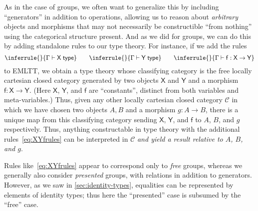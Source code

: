 \documentclass[12pt]{article}
\def\ty{\;\mathsf{type}}
\def\m#1{\llbracket#1\rrbracket}
\def\types{\vdash}
\def\U{\mathscr{U}}
\def\C{\mathscr{C}}
\numberwithin{equation}{section}
\begin{document}
As in the case of groups, we often want to generalize this by including ``generators'' in addition to operations, allowing us to reason about \emph{arbitrary} objects and morphisms that may not necessarily be constructible ``from nothing'' using the categorical structure present.
And as we did for groups, we can do this by adding standalone rules to our type theory.
For instance, if we add the rules
\begin{equation}\label{eq:XYfrules}
  \inferrule{ }{\Gamma\types \mathsf{X}\ty} \qquad
  \inferrule{ }{\Gamma\types \mathsf{Y}\ty} \qquad
  \inferrule{ }{\Gamma\types \mathsf{f}:\mathsf{X}\to \mathsf{Y}}  
\end{equation}
to EMLTT, we obtain a type theory whose classifying category is the free locally cartesian closed category generated by two objects $\mathsf X$ and $\mathsf{Y}$ and a morphism $\mathsf{f}:\mathsf{X}\to \mathsf{Y}$.
(Here $\mathsf{X}$, $\mathsf{Y}$, and $\mathsf{f}$ are ``constants'', distinct from both variables and meta-variables.)
Thus, given any other locally cartesian closed category $\C$ in which we have chosen two objects $A,B$ and a morphism $g:A\to B$, there is a unique map from this classifying category sending $\mathsf{X}$, $\mathsf{Y}$, and $\mathsf{f}$ to $A$, $B$, and $g$ respectively.
Thus, anything constructable in type theory with the additional rules~\eqref{eq:XYfrules} can be interpreted in $\C$ \emph{and yield a result relative to $A$, $B$, and $g$}.

Rules like~\eqref{eq:XYfrules} appear to correspond only to \emph{free} groups, whereas we generally also consider \emph{presented} groups, with relations in addition to generators. %
However, as we saw in \cref{sec:identity-types}, equalities can be represented by elements of identity types; thus here the ``presented'' case is subsumed by the ``free'' case.

\end{document}
